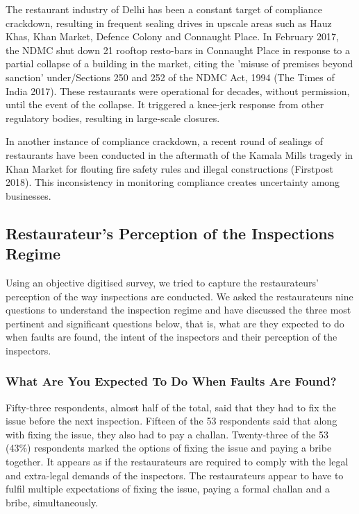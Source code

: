 \documentclass[a4paper, 12pt]{article}
\begin{document}
		The restaurant industry of Delhi has been a constant target of compliance crackdown, resulting in frequent sealing drives in upscale areas such as Hauz Khas, Khan Market, Defence Colony and Connaught Place. In February 2017, the NDMC shut down 21 rooftop resto-bars in Connaught Place in response to a partial collapse of a building in the market, citing the 'misuse of premises beyond sanction' under/Sections 250 and 252 of the NDMC Act, 1994 (The Times of India 2017). These restaurants were operational for decades, without permission, until the event of the collapse. It triggered a knee-jerk response from other regulatory bodies, resulting in large-scale closures.
		
		In another instance of compliance crackdown, a recent round of sealings of restaurants have been conducted in the aftermath of the Kamala Mills tragedy in Khan Market for flouting fire safety rules and illegal constructions (Firstpost 2018). This inconsistency in monitoring compliance creates uncertainty among businesses.
		
		\subsection{Restaurateur’s Perception of the Inspections Regime}
		Using an objective digitised survey, we tried to capture the restaurateurs’ perception of the way inspections are conducted. We asked the restaurateurs nine questions to understand the inspection regime and have discussed the three most pertinent and significant questions below, that is, what are they expected to do when faults are found, the intent of the inspectors and their perception of the inspectors.
		
		\subsubsection {What Are You Expected To Do When Faults Are Found?}
		Fifty-three respondents, almost half of the total, said that they had to fix the issue before the next inspection. Fifteen of the 53 respondents said that along with fixing the issue, they also had to pay a challan. Twenty-three of the 53 (43\%) respondents marked the options of fixing the issue and paying a bribe together. It appears as if the restaurateurs are required to comply with the legal and extra-legal demands of the inspectors. The restaurateurs appear to have to fulfil multiple expectations of fixing the issue, paying a formal challan and a bribe, simultaneously.
\end{document}
